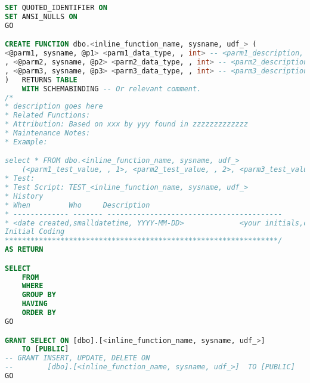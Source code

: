 \begin{lstlisting}[language=SQL, caption= Inline function template, label={lst:inlineFunctionSyntax}]
SET QUOTED_IDENTIFIER ON
SET ANSI_NULLS ON
GO

CREATE FUNCTION dbo.<inline_function_name, sysname, udf_> (
<@parm1, sysname, @p1> <parm1_data_type, , int> -- <parm1_description, ,>
, <@parm2, sysname, @p2> <parm2_data_type, , int> -- <parm2_description, ,>
, <@parm3, sysname, @p3> <parm3_data_type, , int> -- <parm3_description, ,>
)   RETURNS TABLE
    WITH SCHEMABINDING -- Or relevant comment.
/*
* description goes here
* Related Functions:
* Attribution: Based on xxx by yyy found in zzzzzzzzzzzzz
* Maintenance Notes:
* Example:    

select * FROM dbo.<inline_function_name, sysname, udf_>
    (<parm1_test_value, , 1>, <parm2_test_value, , 2>, <parm3_test_value, , 3>)
* Test:
* Test Script: TEST_<inline_function_name, sysname, udf_>
* History
* When         Who     Description
* ------------- ------- -----------------------------------------
* <date created,smalldatetime, YYYY-MM-DD>             <your initials,char(8), XXX>
Initial Coding
****************************************************************/
AS RETURN

SELECT
    FROM
    WHERE
    GROUP BY
    HAVING
    ORDER BY
GO

GRANT SELECT ON [dbo].[<inline_function_name, sysname, udf_>]
    TO [PUBLIC]
-- GRANT INSERT, UPDATE, DELETE ON
--        [dbo].[<inline_function_name, sysname, udf_>]  TO [PUBLIC]
GO
\end{lstlisting}


